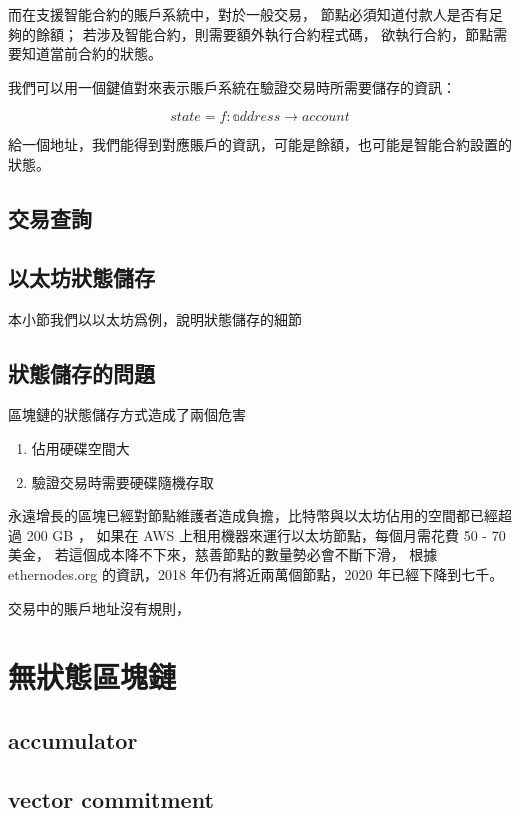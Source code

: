 而在支援智能合約的賬戶系統中，對於一般交易，
節點必須知道付款人是否有足夠的餘額；
若涉及智能合約，則需要額外執行合約程式碼，
欲執行合約，節點需要知道當前合約的狀態。

我們可以用一個鍵值對來表示賬戶系統在驗證交易時所需要儲存的資訊：

\[state = f:\mathbb address\to account \]

給一個地址，我們能得到對應賬戶的資訊，可能是餘額，也可能是智能合約設置的狀態。

\subsection{交易查詢}

\subsection{以太坊狀態儲存}

本小節我們以以太坊爲例，說明狀態儲存的細節

\subsection{狀態儲存的問題}

區塊鏈的狀態儲存方式造成了兩個危害

\begin{enumerate}
  \item 佔用硬碟空間大
  \item 驗證交易時需要硬碟隨機存取
\end{enumerate}

永遠增長的區塊已經對節點維護者造成負擔，比特幣與以太坊佔用的空間都已經超過 200 GB ，
如果在 AWS 上租用機器來運行以太坊節點，每個月需花費 50 - 70 美金，
若這個成本降不下來，慈善節點的數量勢必會不斷下滑，
根據 ethernodes.org 的資訊，2018 年仍有將近兩萬個節點，2020 年已經下降到七千。

交易中的賬戶地址沒有規則，

\section{無狀態區塊鏈}



\subsection{accumulator}
\subsection{vector commitment}
